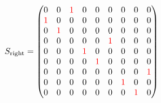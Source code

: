 \begin{align}
  S_{\text{right}} =
  \begin{pmatrix}
    0                  & 0                  & \textcolor{red}{1} & 0                  & 0                  & 0                  & 0                  & 0                  & 0                  \\
    \textcolor{red}{1} & 0                  & 0                  & 0                  & 0                  & 0                  & 0                  & 0                  & 0                  \\
    0                  & \textcolor{red}{1} & 0                  & 0                  & 0                  & 0                  & 0                  & 0                  & 0                  \\
    0                  & 0                  & 0                  & 0                  & 0                  & \textcolor{red}{1} & 0                  & 0                  & 0                  \\
    0                  & 0                  & 0                  & \textcolor{red}{1} & 0                  & 0                  & 0                  & 0                  & 0                  \\
    0                  & 0                  & 0                  & 0                  & \textcolor{red}{1} & 0                  & 0                  & 0                  & 0                  \\
    0                  & 0                  & 0                  & 0                  & 0                  & 0                  & 0                  & 0                  & \textcolor{red}{1} \\
    0                  & 0                  & 0                  & 0                  & 0                  & 0                  & \textcolor{red}{1} & 0                  & 0                  \\
    0                  & 0                  & 0                  & 0                  & 0                  & 0                  & 0                  & \textcolor{red}{1} & 0
  \end{pmatrix}
\end{align}


